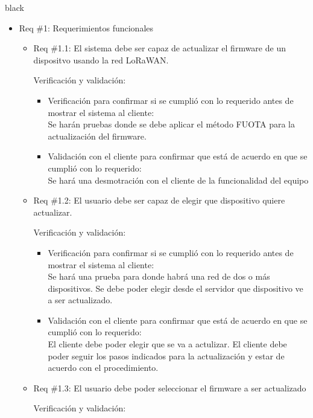 \documentclass[11pt]{charter}
\begin{document}
\begin{consigna}{black}
\begin{itemize} 
\item Req \#1: Requerimientos funcionales
\begin{itemize}
	\item Req \#1.1: El sistema debe ser capaz de actualizar el firmware de un dispositvo usando la red LoRaWAN.
	
	Verificación y validación:
	
	\begin{itemize}
		\item Verificación para confirmar si se cumplió con lo requerido antes de mostrar el sistema al cliente:\\
		Se harán pruebas donde se debe aplicar el método FUOTA para la actualización del firmware.
		\item Validación con el cliente para confirmar que está de acuerdo en que se cumplió con lo requerido:\\
		Se hará una desmotración con el cliente de la funcionalidad del equipo  
	\end{itemize}

	\item Req \#1.2: El usuario debe ser capaz de elegir que dispositivo quiere actualizar.
	
	Verificación y validación:
	
	\begin{itemize}
		\item Verificación para confirmar si se cumplió con lo requerido antes de mostrar el sistema al cliente:\\
		Se hará una prueba para donde habrá una red de dos o más dispositivos. Se debe poder elegir desde el servidor que dispositivo ve a ser actualizado.
		\item Validación con el cliente para confirmar que está de acuerdo en que se cumplió con lo requerido:\\
		El cliente debe poder elegir que se va a actulizar. El cliente debe poder seguir los pasos indicados para la actualización y estar de acuerdo con el procedimiento.
	\end{itemize}

	\item Req \#1.3: El usuario debe poder seleccionar el firmware a ser actualizado
	
	Verificación y validación:


\end{itemize}
\end{itemize}
\end{consigna}
\end{document}
